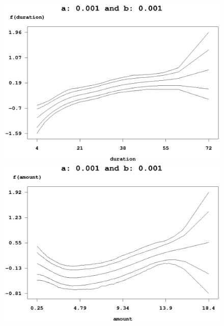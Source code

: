 \begin{figure}[ht]
\vspace{0.5cm}
\begin{center}
\includegraphics[scale=0.4]{grafiken/credit_duration_a001b001.ps} \hspace{0.3cm}
\includegraphics[scale=0.4]{grafiken/credit_amount_a001b001.ps}


\end{center}
\end{figure}
